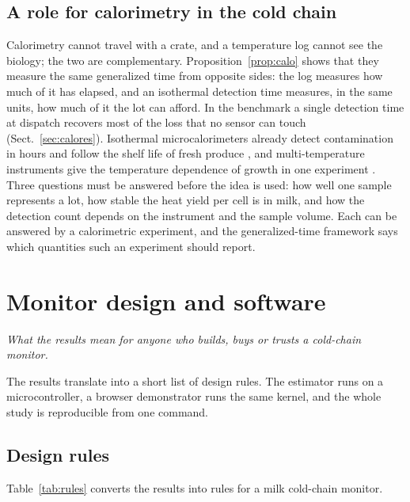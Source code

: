 \documentclass[11pt,a4paper,twoside,openany]{book}
\newcommand{\hook}[1]{{\noindent\fontsize{14}{20}\selectfont\itshape\color{dggrey}#1\par}\vspace{14pt}}
\newcommand{\secref}[1]{Sect.~\ref{#1}}
\theoremstyle{plain}\newtheorem{proposition}{Proposition}\newtheorem{corollary}{Corollary}
\theoremstyle{definition}\newtheorem{definition}{Definition}[chapter]
\begin{document}
\TabCalo

\section{A role for calorimetry in the cold chain}
Calorimetry cannot travel with a crate, and a temperature log cannot see the biology; the two are complementary. Proposition~\ref{prop:calo} shows that they measure the same generalized time from opposite sides: the log measures how much of it has elapsed, and an isothermal detection time measures, in the same units, how much of it the lot can afford. In the benchmark a single detection time at dispatch recovers most of the loss that no sensor can touch (\secref{sec:calores}). Isothermal microcalorimeters already detect contamination in hours \cite{fricke2020} and follow the shelf life of fresh produce \cite{haman2019}, and multi-temperature instruments give the temperature dependence of growth in one experiment \cite{wadso2011}. Three questions must be answered before the idea is used: how well one sample represents a lot, how stable the heat yield per cell is in milk, and how the detection count depends on the instrument and the sample volume. Each can be answered by a calorimetric experiment, and the generalized-time framework says which quantities such an experiment should report.


\chapter{Monitor design and software}\label{ch:design}
\hook{What the results mean for anyone who builds, buys or trusts a cold-chain monitor.}
\begin{summary}
The results translate into a short list of design rules. The estimator runs on a microcontroller, a browser demonstrator runs the same kernel, and the whole study is reproducible from one command.
\end{summary}
\section{Design rules}
Table~\ref{tab:rules} converts the results into rules for a milk cold-chain monitor.
\end{document}
